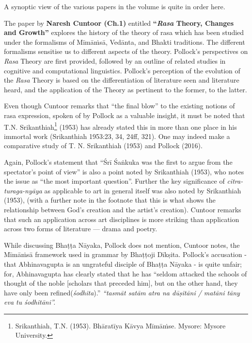 A synoptic view of the various papers in the volume is quite in order here.

The paper by {\bf Naresh Cuntoor (Ch.1)} entitled {\bf“\textsl{Rasa} Theory, Changes and Growth”} explores the history of the theory of rasa which has been studied under the formalisms of Mīmāṁsā, Vedānta, and Bhakti traditions. The different formalisms sensitise us to different aspects of the theory. Pollock’s perspectives on \textsl{Rasa} Theory are first provided, followed by an outline of related studies in cognitive and computational linguistics. Pollock’s perception of the evolution of the \textsl{Rasa} Theory is based on the differentiation of literature seen and literature heard, and the application of the Theory as pertinent to the former, to the latter.

Even though Cuntoor remarks that “the final blow” to the existing notions of rasa expression, spoken of by Pollock as a valuable insight, it must be noted that T.N. Srikanthiah\footnote[1]{Srikanthiah, T.N. (1953). Bhāratīya Kāvya Mīmāṁse. Mysore: Mysore University.} (1953) has already stated this in more than one place in his immortal work (Srikanthiah 1953:23, 34, 24ff, 321). One may indeed make a comparative study of T. N. Srikanthiah (1953) and Pollock (2016).

Again, Pollock's statement that “Śrī Śaṅkuka was the first to argue from the spectator's point of view” is also a point noted by Srikanthiah (1953), who notes the issue as “the most important question”. Further the key significance of \textsl{citra-turaga-nyāya} as applicable to art in general itself was also noted by Srikanthiah (1953), (with a further note in the footnote that this is what shows the relationship between God's creation and the artist's creation). Cuntoor remarks that such an application across art disciplines is more striking than application across two forms of literature --- drama and poetry.

While discussing Bhaṭṭa Nāyaka, Pollock does not mention, Cuntoor notes, the Mīmāṁsā framework used in grammar by Bhaṭṭoji Dīkṣita. Pollock's accusation - that Abhinavagupta is an ungrateful disciple of Bhaṭṭa Nāyaka - is quite unfair; for, Abhinavagupta has clearly stated that he has “seldom attacked the schools of thought of the noble [scholars that preceded him], but on the other hand, they have only been refined(\textsl{śodhita}).” \textsl{“tasmāt satām atra na dūṣitāni / matāni tāny eva tu śodhitāni”.}

